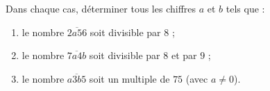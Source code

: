 
Dans chaque cas, déterminer tous les chiffres $a$ et $b$ tels que :
\begin{enumerate}
  \item le nombre $\overline{2a56}$ soit divisible par $8$ ;
  \item le nombre $\overline{7a4b}$ soit divisible par $8$ et par $9$ ;
  \item le nombre $\overline{a3b5}$ soit un multiple de $75$ (avec $a\neq0$).
\end{enumerate}


